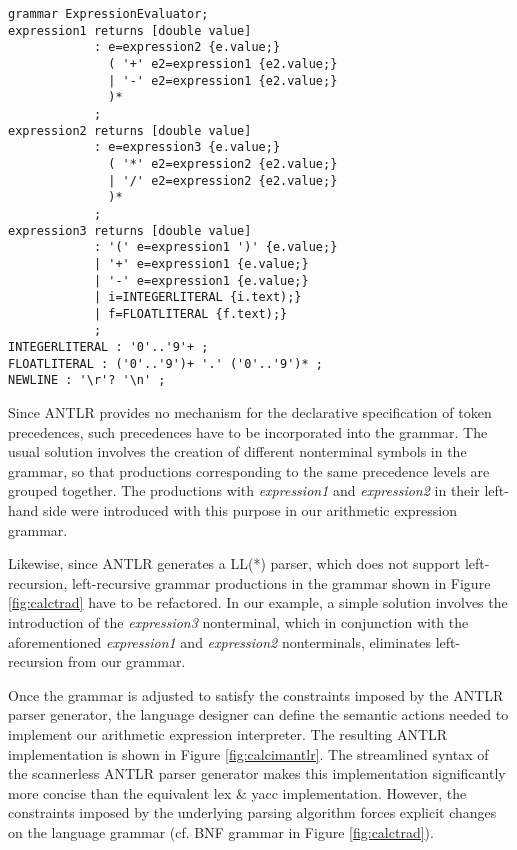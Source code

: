 \documentclass[preprint]{elsarticle}
\begin{document}
\begin{figure*}[tb!]
\begin{verbatim}
grammar ExpressionEvaluator;
expression1 returns [double value]
            : e=expression2 {e.value;}
              ( '+' e2=expression1 {e2.value;}
              | '-' e2=expression1 {e2.value;}
              )*
            ;
expression2 returns [double value]
            : e=expression3 {e.value;}
              ( '*' e2=expression2 {e2.value;}
              | '/' e2=expression2 {e2.value;}
              )*
            ;
expression3 returns [double value]
            : '(' e=expression1 ')' {e.value;}
            | '+' e=expression1 {e.value;}
            | '-' e=expression1 {e.value;}
            | i=INTEGERLITERAL {i.text);}
            | f=FLOATLITERAL {f.text);}
            ;
INTEGERLITERAL : '0'..'9'+ ;
FLOATLITERAL : ('0'..'9')+ '.' ('0'..'9')* ;
NEWLINE : '\r'? '\n' ;
\end{verbatim}
\caption{Complete ANTLR implementation of the arithmetic expression interpreter.} \label{fig:calcimantlr}
\end{figure*}

Since ANTLR provides no mechanism for the declarative specification of token precedences, such precedences have to be incorporated into the grammar.
The usual solution involves the creation of different nonterminal symbols in the grammar, so that productions corresponding to the same precedence levels are grouped together.
The productions with \emph{expression1} and \emph{expression2} in their left-hand side were introduced with this purpose in our arithmetic expression grammar.

Likewise, since ANTLR generates a LL(*) parser, which does not support left-recursion, left-recursive grammar productions in the grammar shown in Figure \ref{fig:calctrad} have to be refactored.
In our example, a simple solution involves the introduction of the \emph{expression3} nonterminal, which in conjunction with the aforementioned \emph{expression1} and \emph{expression2} nonterminals, eliminates left-recursion from our grammar.

Once the grammar is adjusted to satisfy the constraints imposed by the ANTLR parser generator, the language designer can define the semantic actions needed to implement our arithmetic expression interpreter.
The resulting ANTLR implementation is shown in Figure \ref{fig:calcimantlr}.
The streamlined syntax of the scannerless ANTLR parser generator makes this implementation significantly more concise than the equivalent lex \& yacc implementation.
However, the constraints imposed by the underlying parsing algorithm forces explicit changes on the language grammar (cf. BNF grammar in Figure \ref{fig:calctrad}).
\end{document}
